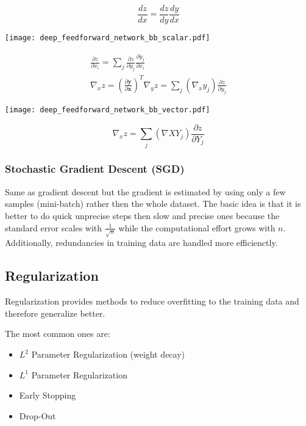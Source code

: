 \begin{equation*}
    \frac{dz}{dx} = \frac{dz}{dy}\frac{dy}{dx}
\end{equation*}

\begin{center}
    \texttt{[image: deep\_feedforward\_network\_bb\_scalar.pdf]}
\end{center}

\begin{gather*}
    \frac{\partial z}{\partial x_i} = \sum_{j}\frac{\partial z}{\partial y_j}\frac{\partial y_j}{\partial x_i} \\
    \nabla_x z = {\left(\frac{\partial \mathbf{y}}{\partial \mathbf{x}}\right)}^T \nabla_y z = \sum_{j}(\nabla_x y_j)\frac{\partial z}{\partial y_j}
\end{gather*}

\begin{center}
    \texttt{[image: deep\_feedforward\_network\_bb\_vector.pdf]}
\end{center}

\begin{equation*}
    \nabla_x z = \sum_{j}(\nabla X Y_j)\frac{\partial z}{\partial Y_j}
\end{equation*}

\subsubsection{Stochastic Gradient Descent (SGD)}

Same as gradient descent but the gradient is estimated by using only a few samples (mini-batch) rather then the whole dataset.
The basic idea is that it is better to do quick unprecise steps then slow and precise ones because the standard error scales with $\frac{1}{\sqrt{n}}$ while the computational effort grows with $n$.
Additionally, redundancies in training data are handled more efficienctly.

\subsection{Regularization}

Regularization provides methods to reduce overfitting to the training data and therefore generalize better.

The most common ones are:
\begin{itemize}
    \item $L^2$ Parameter Regularization (weight decay)
    \item $L^1$ Parameter Regularization
    \item Early Stopping
    \item Drop-Out
\end{itemize}

